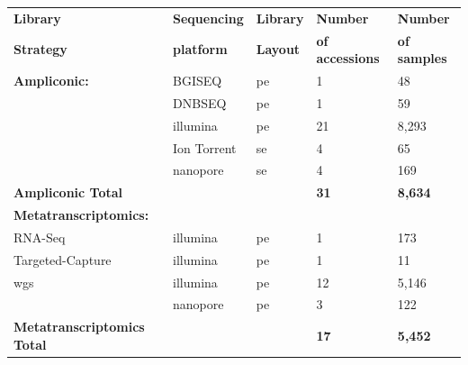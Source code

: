             \begin{table}[ht!]
                \centering
                \small
                \begin{tabular}{lllll}
               \textbf{Library}        & \textbf{Sequencing} &  \textbf{Library}    & \textbf{Number}   & \textbf{Number} \\ 
                \textbf{Strategy}        & \textbf{platform} & \textbf{Layout}    & \textbf{of accessions}   & \textbf{of samples} \\ \hline
                \textbf{Ampliconic:}                        &BGISEQ                      &  \acrlong{pe}                & 1              & 48 \\
                                       &  DNBSEQ                      & \acrlong{pe}                 & 1              & 59 \\
                                    & \acrshort{illumina}         & \acrlong{pe}                   & 21              & 8,293 \\
                &                 Ion Torrent                   & \acrlong{se}             & 4          & 65 \\ 
                 &                  \acrshort{nanopore}                 & \acrlong{se}             & 4          & 169\\ 
                  \textbf{Ampliconic Total}                 &             &           & \textbf{31}              & \textbf{8,634} \\   \hline 
               \textbf{Metatranscriptomics:}        &                      &           &               & \\
               RNA-Seq                             &    \acrshort{illumina}           &  \acrlong{pe}            & 1              & 173 \\
                Targeted-Capture                          &   \acrshort{illumina}                 &  \acrlong{pe}            & 1              & 11 \\
                 \acrshort{wgs}                          &    \acrshort{illumina}               &  \acrlong{pe}            & 12              & 5,146 \\
                                  &    \acrshort{nanopore}               &  \acrlong{pe}            & 3              & 122 \\
                  \textbf{Metatranscriptomics Total}                 &             &           & \textbf{17}              & \textbf{5,452} \\   \hline

\end{tabular}
\end{table}

